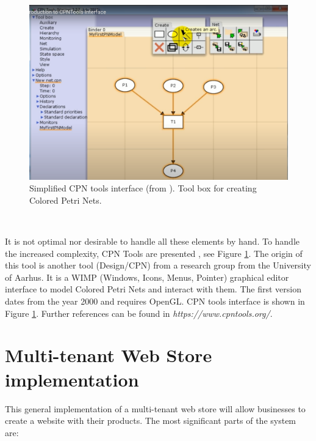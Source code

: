 \documentclass[12pt,english]{article} %
\begin{document}
\begin{figure}[H]
    \centering
    \includegraphics[scale=0.25]{img/petri-net/cpn-tools/examples/cpn-tools-create-net.png}
    \caption{Simplified CPN tools interface (from \cite{cpn-tools-tutorial-youtube}). Tool box for creating Colored Petri Nets.}
    \label{fig:cpn-tools-create-net}
\end{figure}

\


It is not optimal nor desirable to handle all these elements by hand.
To handle the increased complexity, CPN Tools are presented \cite{cpn-tools}, see Figure \ref{fig:cpn-tools-create-net}.
The origin of this tool is another tool (Design/CPN) from a research group from the University of Aarhus.
It is a WIMP (Windows, Icons, Menus, Pointer) graphical editor interface to model Colored Petri Nets and interact with them.
The first version dates from the year 2000 and requires OpenGL.
\cite{performance-analysis-cpn-tools}
CPN tools interface is shown in Figure \ref{fig:cpn-tools-create-net}.
Further references can be found in \textit{https://www.cpntools.org/}.



\newpage



\section{Multi-tenant Web Store implementation}
This general implementation of a multi-tenant web store will allow businesses to create a website with their products.
The most significant parts of the system are:
\end{document}
